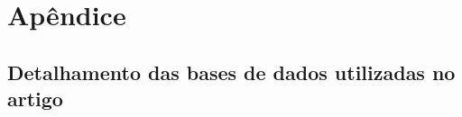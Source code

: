 \documentclass[twoside,onecolumn,12pt]{article}
\numberwithin{outputctr}{section}
\begin{document}

% 
%  
\newpage


\clearpage


\section{Ap\^{e}ndice \label{secApendice}}

\subsection{Detalhamento das bases de dados utilizadas no artigo \label{secApendice_BDs}}
\end{document}
